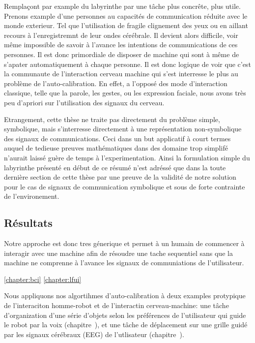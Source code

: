 Remplaçont par example du labyrinthe par une tâche plus concrête, plus utile. Prenons example d'une personnes  au capacités de communication réduite avec le monde exterieur. Tel que l'utilisation de fragile clignement des yeux ou en aillant recours à l'enregistremnt de leur ondes cérébrale. Il devient alors difficile, voir même impossible de savoir à l'avance les intentions de communications de ces personnes. Il est donc primordiale de disposer de machine qui sont à même de s'apater automatiquement à chaque personne. Il est donc logique de voir que c'est la communaute de l'interaction cerveau machine qui s'est interresse le plus au problème de l'auto-calibration. En effet, a l'opposé des mode d'interaction classique, telle que la parole, les gestes, ou les expression faciale, nous avons très peu d'apriori sur l'utilisation des signaux du cerveau.

Etrangement, cette thèse ne traite pas directement du problème simple, symbolique, mais s'interresse directement à une représentation non-symbolique des signaux de communications. Ceci dans un but applicatif à court termes auquel de tedieuse preuves mathématiques dans des domaine trop simplifé n'aurait laissé guère de temps à l'experimentation. Ainsi la formulation simple du labyrinthe présenté en début de ce résumé n'est adréssé que dans la toute dernière section de cette thèse par une preuve de la validité de notre solution pour le cas de signaux de communication symbolique et sous de forte contrainte de l'environement.

\subsection*{Résultats}

Notre approche est donc tres génerique et permet à un humain de commencer à interagir avec une machine afin de résoudre une tache sequentiel sans que la machine ne comprenne à l'avance les signaux de communiations de l'utilisateur.

\ref{chapter:bci}
\ref{chapter:lfui}

Nous appliquons nos algortihmes d'auto-calibration à deux examples protypique de l'interaciton homme-robot et de l'interactin cerveau-machine: une tâche d'organization d'une série d'objets selon les préférences de l'utilisateur qui guide le robot par la voix (chapitre~), et une tâche de déplacement sur une grille guidé par les signaux cérébraux (EEG) de l'utlisateur (chapitre~).

